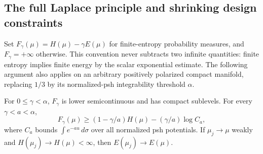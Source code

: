 \subsection{The full Laplace principle and shrinking design constraints}

Set $F_\gamma(\mu)=H(\mu)-\gamma E(\mu)$ for finite-entropy
probability measures, and $F_\gamma=+\infty$ otherwise. This convention
never subtracts two infinite quantities: finite entropy implies finite
energy by the scalar exponential estimate. The following argument also
applies on an arbitrary positively polarized compact manifold, replacing
$1/3$ by its normalized-psh integrability threshold $\alpha$.

\begin{lemma}
\label{att:good-rate}
For $0\le\gamma<\alpha$, $F_\gamma$ is lower semicontinuous and
has compact sublevels. For every $\gamma<a<\alpha$,
\begin{equation}
 F_\gamma(\mu)\ge(1-\gamma/a)H(\mu)
                          -(\gamma/a)\log C_a,
 \label{att:coercivity}
\end{equation}
where $C_a$ bounds $\int e^{-au}\,d\sigma$ over all normalized psh
potentials. If $\mu_j\to\mu$ weakly and
$H(\mu_j)\to H(\mu)<\infty$, then $E(\mu_j)\to E(\mu)$.
\end{lemma}

